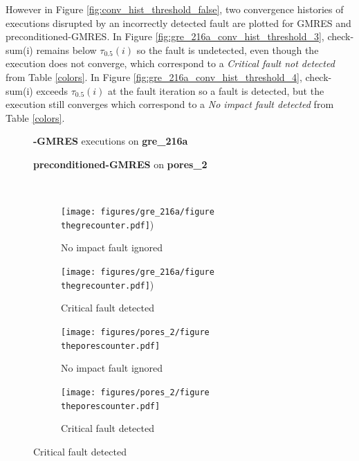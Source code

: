 \documentclass[twoside]{article}
\newcounter{fig}\setcounter{fig}{0}
\begin{document}
  However in Figure \ref{fig:conv_hist_threshold_false}, two convergence histories of executions disrupted by an incorrectly detected fault are plotted for GMRES and preconditioned-GMRES. In Figure \ref{fig:gre_216a_conv_hist_threshold_3}, check-sum(i) remains below $\tau_{0.5}(i)$ so the fault is undetected, even though the execution does not converge, which correspond to a \emph{Critical fault not detected} from Table \ref{colors}. In Figure \ref{fig:gre_216a_conv_hist_threshold_4}, check-sum(i) exceeds $\tau_{0.5}(i)$ at the fault iteration so a fault is detected, but the execution still converges which correspond to a \emph{No impact fault detected} from Table \ref{colors}. 
  \begin{figure}[H]
    \centering
    
    \begin{minipage}[b]{0.45\linewidth}
      \centering
      \textbf{-GMRES} executions on \textbf{gre_216a} 
    \end{minipage}
    \quad
    \begin{minipage}{0.45\linewidth}
      \centering
      \textbf{preconditioned-GMRES} on \textbf{pores_2}
    \end{minipage}\\


    \begin{minipage}[b]{0.48\linewidth}
      
      \begin{subfigure}[t]{\linewidth}
        \centering
        \texttt{[image: figures/gre\_216a/figure\\thegrecounter.pdf]})
        \caption{No impact fault ignored}\label{fig:gre_216a_conv_hist_threshold_0}
      \end{subfigure}
      \quad
      \begin{subfigure}[t]{\linewidth}
        \centering
        \texttt{[image: figures/gre\_216a/figure\\thegrecounter.pdf]})
        \caption{Critical fault detected}\label{fig:gre_216a_conv_hist_threshold_2}
      \end{subfigure}
    \end{minipage}
    \quad
    \begin{minipage}[b]{0.48\linewidth}
      
      \begin{subfigure}[t]{\linewidth}
        \centering
        \texttt{[image: figures/pores\_2/figure\\theporescounter.pdf]}
        \caption{No impact fault ignored}\label{fig:pores_2_conv_hist_threshold_0}
      \end{subfigure}
      \quad
      \begin{subfigure}[t]{\linewidth}
        \centering
        \texttt{[image: figures/pores\_2/figure\\theporescounter.pdf]}
        \caption{Critical fault detected}\label{fig:pores_2_conv_hist_threshold_2}
      \end{subfigure}


\end{minipage}
\end{figure}
\end{document}
